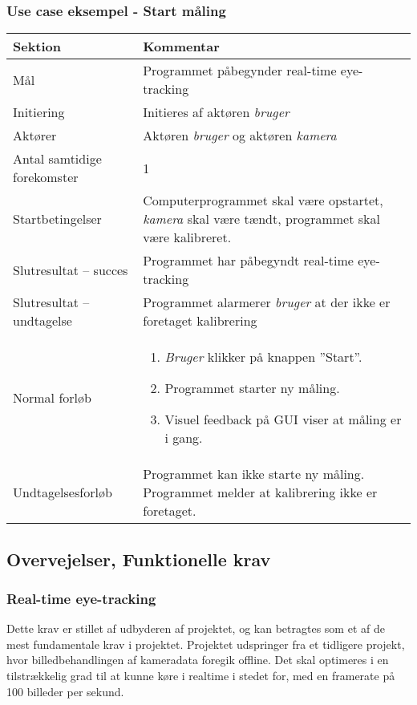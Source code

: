 \documentclass[rapport.tex]{subfiles}
\begin{document}
		\subsubsection{Use case eksempel - Start måling}
		\begin{tabular}{|l|p{7.7cm}|}
			\hline \textbf{Sektion} 	& \textbf{Kommentar} \\ 
			\hline Mål  & Programmet påbegynder real-time eye-tracking \\ 
			\hline Initiering  & Initieres af aktøren \textit{bruger} \\ 
			\hline Aktører & Aktøren \textit{bruger} og aktøren \textit{kamera} \\ 
			\hline Antal samtidige forekomster & 1 \\ 
			\hline Startbetingelser & Computerprogrammet skal være opstartet, \textit{kamera} skal være tændt, programmet skal være kalibreret. \\ 
			\hline Slutresultat – succes & Programmet har påbegyndt real-time eye-tracking\\ 
			\hline Slutresultat – undtagelse & Programmet alarmerer \textit{bruger} at der ikke er foretaget kalibrering \\ 
			\hline Normal forløb & \begin{enumerate}
				\item \textit{Bruger} klikker på knappen ”Start”.
				\item Programmet starter ny måling.
				\item Visuel feedback på GUI viser at måling er i gang.
			\end{enumerate} \\  
			\hline Undtagelsesforløb & Programmet kan ikke starte ny måling. Programmet melder
			at kalibrering ikke er foretaget.\\
			\hline 
		\end{tabular}
		
	\subsection{Overvejelser, Funktionelle krav}	
	
	\subsubsection{Real-time eye-tracking}
	Dette krav er stillet af udbyderen af projektet, og kan
	betragtes som et af de mest fundamentale krav i projektet. Projektet udspringer fra et tidligere projekt, hvor billedbehandlingen af kameradata foregik offline. Det skal optimeres i en tilstrækkelig grad til at kunne køre i realtime i stedet for, med en framerate på 100 billeder per sekund.
	
\end{document}
